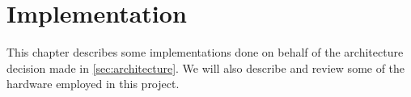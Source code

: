 \chapter{Implementation}\label{part:implementation}

This chapter describes some implementations done on behalf of the architecture decision made in \cref{sec:architecture}. We will also describe and review some of the hardware employed in this project.









